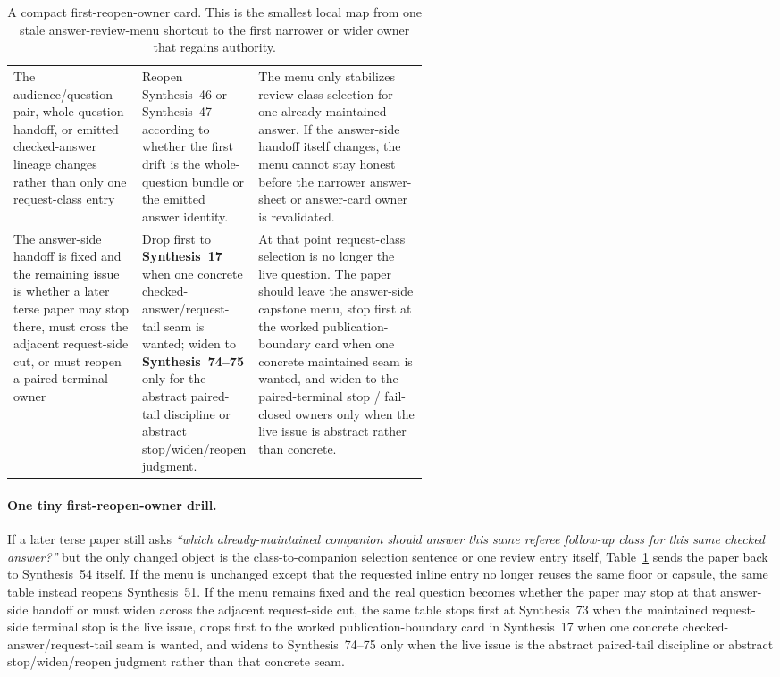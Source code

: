 \documentclass[11pt]{article}
\begin{document}
\begin{table}[t]
\begin{tabularx}{\linewidth}{@{}p{0.31\linewidth}p{0.23\linewidth}X@{}}
The audience/question pair, whole-question handoff, or emitted checked-answer lineage changes rather than only one request-class entry & Reopen Synthesis~46 or Synthesis~47 according to whether the first drift is the whole-question bundle or the emitted answer identity. & The menu only stabilizes review-class selection for one already-maintained answer. If the answer-side handoff itself changes, the menu cannot stay honest before the narrower answer-sheet or answer-card owner is revalidated. \\
The answer-side handoff is fixed and the remaining issue is whether a later terse paper may stop there, must cross the adjacent request-side cut, or must reopen a paired-terminal owner & Drop first to \textbf{Synthesis~17} when one concrete checked-answer/request-tail seam is wanted; widen to \textbf{Synthesis~74--75} only for the abstract paired-tail discipline or abstract stop/widen/reopen judgment. & At that point request-class selection is no longer the live question. The paper should leave the answer-side capstone menu, stop first at the worked publication-boundary card when one concrete maintained seam is wanted, and widen to the paired-terminal stop / fail-closed owners only when the live issue is abstract rather than concrete. \\
\bottomrule
\end{tabularx}
\caption{A compact first-reopen-owner card. This is the smallest local map from one stale answer-review-menu shortcut to the first narrower or wider owner that regains authority.}
\label{tab:first-reopen-owner-card-answer-review-menu}
\end{table}

\paragraph{One tiny first-reopen-owner drill.}
If a later terse paper still asks \emph{``which already-maintained companion should answer this same referee follow-up class for this same checked answer?''} but the only changed object is the class-to-companion selection sentence or one review entry itself, Table~\ref{tab:first-reopen-owner-card-answer-review-menu} sends the paper back to Synthesis~54 itself. If the menu is unchanged except that the requested inline entry no longer reuses the same floor or capsule, the same table instead reopens Synthesis~51. If the menu remains fixed and the real question becomes whether the paper may stop at that answer-side handoff or must widen across the adjacent request-side cut, the same table stops first at Synthesis~73 when the maintained request-side terminal stop is the live issue, drops first to the worked publication-boundary card in Synthesis~17 when one concrete checked-answer/request-tail seam is wanted, and widens to Synthesis~74--75 only when the live issue is the abstract paired-tail discipline or abstract stop/widen/reopen judgment rather than that concrete seam.\cite{series:workedexample,series:challengeanswerpublicationprofiles,series:publicrequestresponsepacketrefreshresponsepacketclosureverdicts,series:pairedterminalcitationdiscipline,series:pairedterminalcutoverrules}
\end{document}
